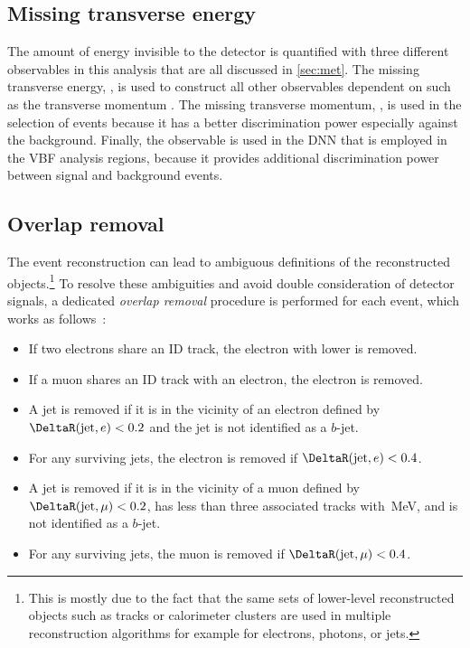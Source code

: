 \subsection{Missing transverse energy}
The amount of energy invisible to the detector is quantified with three different observables in this analysis that are all discussed in \cref{sec:met}.
The missing transverse energy, \ETmiss, is used to construct all other observables dependent on \ETmiss such as the transverse momentum \mT.
The missing transverse momentum, \pTmiss, is used in the selection of events because it has a better discrimination power especially against the \Zjets background.
Finally, the \METSig observable is used in the DNN that is employed in the VBF analysis regions, because
it provides additional discrimination power between signal and background events.


\subsection{Overlap removal}
\label{subsec:overlap-removal}

The event reconstruction can lead to ambiguous definitions of the reconstructed objects.\footnote{This is mostly due to the fact that the same sets of lower-level reconstructed objects such as tracks or calorimeter clusters are used in multiple reconstruction algorithms for example for electrons, photons, or jets.}
To resolve these ambiguities and avoid double consideration of detector signals, a dedicated \emph{overlap removal} procedure is performed for each event, which works as follows~\cite{HWWPaper}:
\begin{itemize}
    \item If two electrons share an ID track, the electron with lower \ET is removed.
    \item If a muon shares an ID track with an electron, the electron is removed.
    \item A jet is removed if it is in the vicinity of an electron defined by $\DeltaR(\text{jet}, e) < 0.2$ and the jet is not identified as a $b$-jet.
    \item For any surviving jets, the electron is removed if $\DeltaR(\text{jet}, e) < 0.4$.
    \item A jet is removed if it is in the vicinity of a muon defined by $\DeltaR(\text{jet}, \mu) < 0.2$, has less than three associated tracks with \,MeV, and is not identified as a $b$-jet.
    \item For any surviving jets, the muon is removed if $\DeltaR(\text{jet}, \mu) < 0.4$.
\end{itemize}

